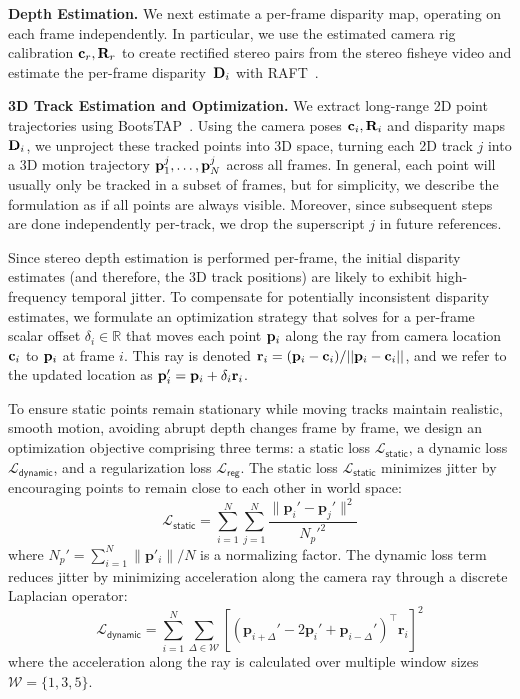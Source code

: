 \medskip 
\noindent \textbf{Depth Estimation.}
We next estimate a per-frame disparity map, operating on each frame independently. In particular, we use the estimated camera rig calibration $\mathbf{c}_r, \mathbf{R}_r$ to create rectified stereo pairs from the stereo fisheye video and estimate the per-frame disparity~$\mathbf{D}_i$ with RAFT~\cite{sun2022disentangling,
sun2021autoflow,teed2020raft}. 

\medskip
\noindent \textbf{3D Track Estimation and Optimization.}  %
We extract long-range 2D point trajectories using BootsTAP~\cite{doersch2024bootstap}. Using the camera poses $\mathbf{c}_i, \mathbf{R}_i$ and disparity maps $\mathbf{D}_i$, we unproject these tracked points into 3D space, turning each 2D track $j$ into a 3D motion trajectory $\mathbf{p}^j_1, \ldots, \mathbf{p}^j_N$
 across all frames. In general, each point will usually only be tracked in a subset of frames, but for simplicity, we describe the formulation as if all points are always visible. Moreover, since subsequent steps are done independently per-track, we drop the superscript $j$ in future references. 

Since stereo depth estimation is performed per-frame, the initial disparity estimates (and therefore, the 3D track positions) are likely to exhibit high-frequency temporal jitter. To compensate for potentially inconsistent disparity estimates, we formulate an optimization strategy that solves for a per-frame scalar offset $\delta_i \in \mathbb{R}$ that moves each point $\mathbf{p}_i$ along the ray from camera location $\mathbf{c}_i$ to $\mathbf{p}_i$ at frame $i$. 
This ray is denoted $\mathbf{r}_i = (\mathbf{p}_i - \mathbf{c}_i) / ||\mathbf{p}_i - \mathbf{c}_i||$, and we refer to the updated location as $\mathbf{p}_i' = \mathbf{p}_i + \delta_i \mathbf{r}_i$. 

To ensure static points remain stationary while moving tracks maintain realistic, smooth motion, avoiding abrupt depth changes frame by frame, we design an optimization objective comprising three terms: a static loss $\mathcal{L}_{\mathsf{static}}$, a dynamic loss $\mathcal{L}_{\mathsf{dynamic}}$, and a regularization loss $\mathcal{L}_{\mathsf{reg}}$. The static loss $\mathcal{L}_{\mathsf{static}}$ minimizes jitter by encouraging points to remain close to each other in world space:
\begin{equation}
\mathcal{L}_{\mathsf{static}} = \sum_{i=1}^{N} \sum_{j=1}^{N} \frac{\| \mathbf{p}_i' - \mathbf{p}_j' \|^2}{N_p'^2}
\label{eq:objective_function}
\end{equation}
where $N_p' = \sum_{i=1}^N{\|\mathbf{p}'_i\|} / N$ is a normalizing factor.
The dynamic loss term reduces jitter by minimizing acceleration along the camera ray through a discrete Laplacian operator:
\begin{equation}
\mathcal{L}_{\mathsf{dynamic}} = \sum_{i=1}^{N} \sum_{\Delta\in\mathcal{W}} \left[ \left( \mathbf{p}_{i+\Delta}' - 2\mathbf{p}_i' + \mathbf{p}_{i-\Delta}' \right)^\top \mathbf{r}_i \right]^2
\label{eq:dynamic_objective}
\end{equation}
where the acceleration along the ray is calculated over
multiple window sizes $\mathcal{W}=\{1,3,5\}$.


